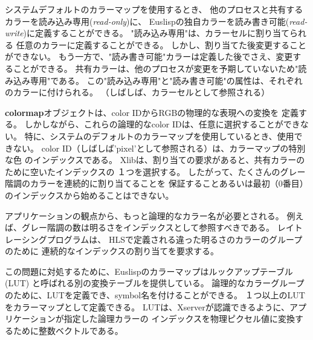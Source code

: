 システムデフォルトのカラーマップを使用するとき、
他のプロセスと共有するカラーを読み込み専用({\em read-only})に、
Euslispの独自カラーを読み書き可能({\em read-write})に定義することができる。
"読み込み専用"は、カラーセルに割り当てられる
任意のカラーに定義することができる。
しかし、割り当てた後変更することができない。
もう一方で、"読み書き可能"カラーは定義した後でさえ、変更することができる。
共有カラーは、他のプロセスが変更を予期していないため"読み込み専用"である。
この"読み込み専用"と"読み書き可能"の属性は、それぞれのカラーに付けられる。
（しばしば、カラーセルとして参照される）

{\bf colormap}オブジェクトは、color IDからRGBの物理的な表現への変換を
定義する。
しかしながら、これらの論理的なcolor IDは、任意に選択することができない。
特に、システムのデフォルトのカラーマップを使用しているとき、使用できない。
color ID（しばしば'pixel'として参照される）は、カラーマップの特別な色
のインデックスである。
Xlibは、割り当ての要求があると、共有カラーのために空いたインデックスの
１つを選択する。
したがって、たくさんのグレー階調のカラーを連続的に割り当てることを
保証することあるいは最初（0番目）のインデックスから始めることはできない。

アプリケーションの観点から、もっと論理的なカラー名が必要とされる。
例えば、グレー階調の数は明るさをインデックスとして参照すべきである。
レイトレーシングプログラムは、
HLSで定義される違った明るさのカラーのグループのために
連続的なインデックスの割り当てを要求する。

この問題に対処するために、Euslispのカラーマップはルックアップテーブル(LUT)
と呼ばれる別の変換テーブルを提供している。
論理的なカラーグループのために、LUTを定義でき、symbol名を付けることができる。
１つ以上のLUTをカラーマップとして定義できる。
LUTは、Xserverが認識できるように、アプリケーションが指定した論理カラーの
インデックスを物理ピクセル値に変換するために整数ベクトルである。
 
